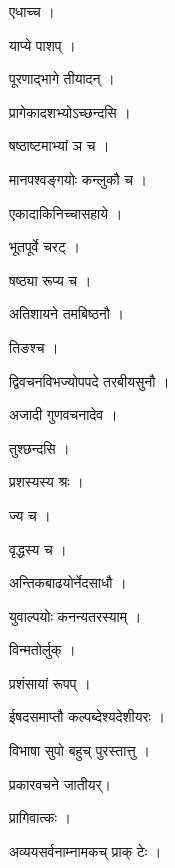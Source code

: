 \documentclass[10pt, openany]{book}
\begin{document}
\noindent एधाच्च ।

\noindent याप्ये पाशप् ।

\noindent पूरणाद्भागे तीयादन् ।

\noindent प्रागेकादशभ्योऽच्छन्दसि ।

\noindent षष्ठाष्टमाभ्यां ञ च ।

\noindent मानपश्वङ्गयोः कन्लुकौ च ।

\noindent एकादाकिनिच्चासहाये ।

\noindent भूतपूर्वे चरट् ।

\noindent षष्ठ्या रूप्य च ।

\noindent अतिशायने तमबिष्ठनौ ।

\noindent तिङश्च ।

\noindent द्विवचनविभज्योपपदे तरबीयसुनौ ।

\noindent अजादी गुणवचनादेव ।

\noindent तुश्छन्दसि ।

\noindent प्रशस्यस्य श्रः ।

\noindent ज्य च ।

\noindent वृद्धस्य च ।

\noindent अन्तिकबाढयोर्नेदसाधौ ।

\noindent युवाल्पयोः कनन्यतरस्याम् ।

\noindent विन्मतोर्लुक् ।

\noindent प्रशंसायां रूपप् ।

\noindent ईषदसमाप्तौ कल्पब्देश्यदेशीयरः ।

\noindent विभाषा सुपो बहुच् पुरस्तात्तु ।

\noindent प्रकारवचने जातीयर्।

\noindent प्रागिवात्कः ।

\noindent अव्ययसर्वनाम्नामकच् प्राक् टेः ।
\end{document}
